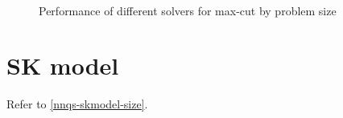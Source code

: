 \begin{figure}[!htbp]
    \centering
    \\
    \caption{Performance of different solvers for max-cut by problem size}
    \label{nnqs-maxcut-size}
\end{figure}

\section{SK model}
Refer to \autoref{nnqs-skmodel-size}.

